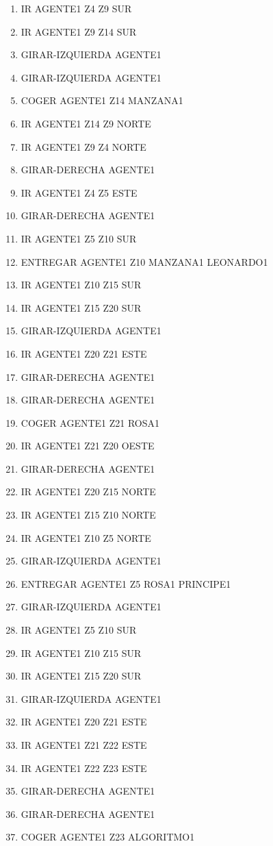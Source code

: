 \documentclass[12pt,a4paper]{article}
\begin{document}
\begin{enumerate}
	\item IR AGENTE1 Z4 Z9 SUR
	\item IR AGENTE1 Z9 Z14 SUR
	\item GIRAR-IZQUIERDA AGENTE1
	\item GIRAR-IZQUIERDA AGENTE1
	\item COGER AGENTE1 Z14 MANZANA1
	\item IR AGENTE1 Z14 Z9 NORTE
	\item IR AGENTE1 Z9 Z4 NORTE
	\item GIRAR-DERECHA AGENTE1
	\item IR AGENTE1 Z4 Z5 ESTE
	\item GIRAR-DERECHA AGENTE1
	\item IR AGENTE1 Z5 Z10 SUR
	\item ENTREGAR AGENTE1 Z10 MANZANA1 LEONARDO1
	\item IR AGENTE1 Z10 Z15 SUR
	\item IR AGENTE1 Z15 Z20 SUR
	\item GIRAR-IZQUIERDA AGENTE1
	\item IR AGENTE1 Z20 Z21 ESTE
	\item GIRAR-DERECHA AGENTE1
	\item GIRAR-DERECHA AGENTE1
	\item COGER AGENTE1 Z21 ROSA1
	\item IR AGENTE1 Z21 Z20 OESTE
	\item GIRAR-DERECHA AGENTE1
	\item IR AGENTE1 Z20 Z15 NORTE
	\item IR AGENTE1 Z15 Z10 NORTE
	\item IR AGENTE1 Z10 Z5 NORTE
	\item GIRAR-IZQUIERDA AGENTE1
	\item ENTREGAR AGENTE1 Z5 ROSA1 PRINCIPE1
	\item GIRAR-IZQUIERDA AGENTE1
	\item IR AGENTE1 Z5 Z10 SUR
	\item IR AGENTE1 Z10 Z15 SUR
	\item IR AGENTE1 Z15 Z20 SUR
	\item GIRAR-IZQUIERDA AGENTE1
	\item IR AGENTE1 Z20 Z21 ESTE
	\item IR AGENTE1 Z21 Z22 ESTE
	\item IR AGENTE1 Z22 Z23 ESTE
	\item GIRAR-DERECHA AGENTE1
	\item GIRAR-DERECHA AGENTE1
	\item COGER AGENTE1 Z23 ALGORITMO1

\end{enumerate}
\end{document}
